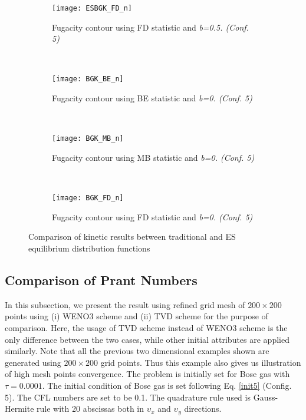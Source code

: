 \documentclass{rsproca}%
\begin{document}
\begin{figure}
\begin{subfigure}[b]{0.32\textwidth}
                \centering
                \texttt{[image: ESBGK\_FD\_n]}
                \caption{Fugacity contour using FD statistic and \it{b=0.5}. (Conf. 5)}
                \label{fig:ESBGK_FD_n}
        \end{subfigure}
        ~ %
        \begin{subfigure}[b]{0.32\textwidth}
                \centering
                \texttt{[image: BGK\_BE\_n]}
                \caption{Fugacity contour using BE statistic and \it{b=0}. (Conf. 5)}
                \label{fig:BGK_BE_n}
        \end{subfigure}%
        ~ %
        \begin{subfigure}[b]{0.32\textwidth}
                \centering
                \texttt{[image: BGK\_MB\_n]}
                \caption{Fugacity contour using MB statistic and \it{b=0}. (Conf. 5)}
                \label{fig:BGK_MB_n}
        \end{subfigure}
        ~ %
        \begin{subfigure}[b]{0.32\textwidth}
                \centering
                \texttt{[image: BGK\_FD\_n]}
                \caption{Fugacity contour using FD statistic and \it{b=0}. (Conf. 5)}
                \label{fig:BGK_FD_n}
        \end{subfigure}
        \caption{Comparison of kinetic results between traditional and ES equilibrium distribution functions}\label{fig:compare_feq}
\end{figure}

\subsection{Comparison of Prant Numbers}
In this subsection, we present the result using refined grid mesh of $200 \times 200$ points using (i) WENO3 scheme and (ii) TVD scheme for the purpose of comparison. Here, the usage of TVD scheme instead of WENO3 scheme is the only difference between the two cases, while other initial attributes are applied similarly. Note that all the previous two dimensional examples shown are generated using $200 \times 200$ grid points. Thus this example also gives us illustration of high mesh points convergence. The problem is initially set for Bose gas with $\tau = 0.0001$. The initial condition of Bose gas is set following Eq. \ref{init5} (Config. 5). The CFL numbers are set to be 0.1. The quadrature rule used is Gauss-Hermite rule with 20 abscissas both in $\upsilon_x$ and $\upsilon_y$ directions.
\end{document}
